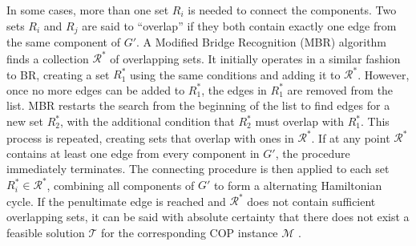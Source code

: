 \documentclass{elsarticle}
\begin{document}
In some cases, more than one set $R_i$ is needed to connect the components. Two sets $R_i$ and $R_j$ are said to ``overlap'' if they both contain exactly one edge from the same component of $G'$. A Modified Bridge Recognition (MBR) algorithm finds a collection $\mathcal{R}^*$ of overlapping sets. It initially operates in a similar fashion to BR, creating a set $R^{*}_1$ using the same conditions and adding it to $\mathcal{R}^*$. However, once no more edges can be added to $R^{*}_1$, the edges in $R^{*}_1$ are removed from the list. MBR restarts the search from the beginning of the list to find edges for a new set $R^{*}_2$, with the additional condition that $R^{*}_2$ must overlap with $R^{*}_1$. This process is repeated, creating sets that overlap with ones in $\mathcal{R}^*$. If at any point $\mathcal{R}^*$ contains at least one edge from every component in $G'$, the procedure immediately terminates. The connecting procedure is then applied to each set $R^{*}_i \in \mathcal{R}^*$, combining all components of $G'$ to form a alternating Hamiltonian cycle. If the penultimate edge is reached and $\mathcal{R}^*$ does not contain sufficient overlapping sets, it can be said with absolute certainty that there does not exist a feasible solution $\mathcal{T}$ for the corresponding COP instance $\mathcal{M}$ \cite{hawa2018}.
\end{document}
